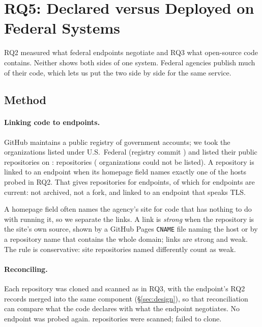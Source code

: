 \section{RQ5: Declared versus Deployed on Federal Systems}
\label{sec:fed}

RQ2 measured what federal endpoints negotiate and RQ3 what open-source code
contains. Neither shows both sides of one system. Federal agencies publish much
of their code, which lets us put the two side by side for the same service.

\subsection{Method}

\paragraph{Linking code to endpoints.} GitHub maintains a public registry of
government accounts; we took the  organizations listed under
U.S.\ Federal (registry commit \texttt{}) and listed
their public repositories on :  repositories
( organizations could not be listed). A repository
is linked to an endpoint when its homepage field names exactly one of the hosts
probed in RQ2. That gives  repositories for
 endpoints, of which  for
 endpoints are current: not archived, not a fork,
and linked to an endpoint that speaks TLS.

A homepage field often names the agency's site for code that has nothing to do
with running it, so we separate the links. A link is \emph{strong} when the
repository is the site's own source, shown by a GitHub Pages \texttt{CNAME}
file naming the host or by a repository name that contains the whole domain;
 links are strong and  weak. The rule is
conservative: site repositories named differently count as weak.

\paragraph{Reconciling.} Each repository was cloned and scanned as in RQ3, with
the endpoint's RQ2 records merged into the same component (\S\ref{sec:design}),
so that reconciliation can compare what the code declares with what the
endpoint negotiates. No endpoint was probed again.
 repositories were scanned;  failed to
clone.

